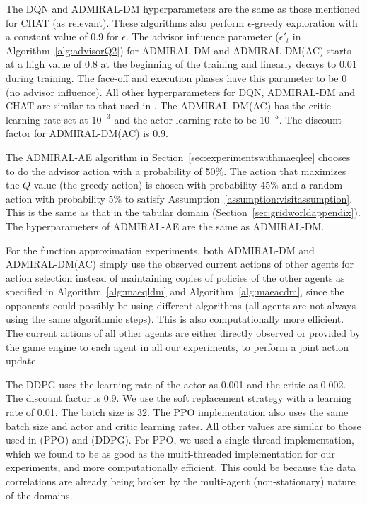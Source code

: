 \documentclass[jair, twoside,11pt,theapa]{article}
\begin{document}


The DQN and ADMIRAL-DM hyperparameters are the same as those mentioned for CHAT (as relevant). These algorithms also perform $\epsilon$-greedy exploration with a constant value of 0.9 for $\epsilon$. The advisor influence parameter ($\epsilon'_t$ in Algorithm~\ref{alg:advisorQ2}) for ADMIRAL-DM and ADMIRAL-DM(AC) starts at a high value of 0.8 at the beginning of the training and linearly decays to 0.01 during training. The face-off and execution phases have this parameter to be 0 (no advisor influence). All other hyperparameters for DQN, ADMIRAL-DM and CHAT are similar to that used in  \citet{mnih2015human}. The ADMIRAL-DM(AC) has the critic learning rate set at $10^{-3}$ and the actor learning rate to be $10^{-5}$. The discount factor for ADMIRAL-DM(AC) is 0.9. 



The ADMIRAL-AE algorithm in Section~\ref{sec:experimentswithmaeqlee} chooses to do the advisor action with a probability of 50\%. The action that maximizes the $Q$-value (the greedy action) is chosen with probability 45\% and a random action with probability 5\% to satisfy Assumption~\ref{assumption:visitassumption}. This is the same as that in the tabular domain (Section~\ref{sec:gridworldappendix}). The hyperparameters of ADMIRAL-AE are the same as ADMIRAL-DM. 

For the function approximation experiments, both ADMIRAL-DM and ADMIRAL-DM(AC) simply use the observed current actions of other agents for action selection instead of maintaining copies of policies of the other agents as specified in Algorithm~\ref{alg:maeqldm} and Algorithm~\ref{alg:maeacdm}, since the opponents could possibly be using different algorithms (all agents are not always using the same algorithmic steps). This is also computationally more efficient. The current actions of all other agents are either directly observed or provided by the game engine to each agent in all our experiments, to perform a joint action update. 



The DDPG uses the learning rate of the actor as 0.001 and the critic as 0.002. The discount factor is 0.9. We use the soft replacement strategy with a learning rate of 0.01. The batch size is 32. The PPO implementation also uses the same batch size and actor and critic learning rates. All other values are similar to those used in \cite{schulman2017proximal} (PPO) and \cite{lillicrap2015continuous} (DDPG). 
For PPO, we used a single-thread implementation, which we found to be as good as the multi-threaded implementation for our experiments, and more computationally efficient. This could be because the data correlations are already being broken by the multi-agent (non-stationary) nature of the domains. 
\end{document}
